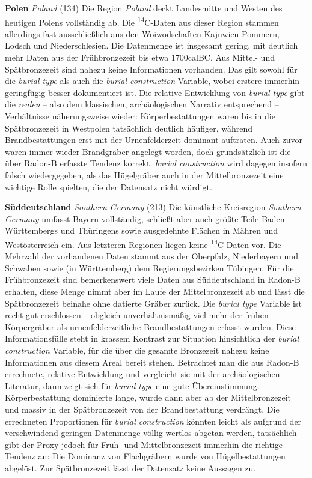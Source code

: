\documentclass[openany,twoside,twocolumn]{book}
\begin{document}
\textbf{Polen} \emph{Poland} (134) \newline  Die Region \emph{Poland}
deckt Landesmitte und Westen des heutigen Polens vollständig ab. Die
\textsuperscript{14}C-Daten aus dieser Region stammen allerdings fast
ausschließlich aus den Woiwodschaften Kajuwien-Pommern, Lodsch und
Niederschlesien. Die Datenmenge ist insgesamt gering, mit deutlich mehr
Daten aus der Frühbronzezeit bis etwa 1700calBC. Aus Mittel- und
Spätbronzezeit sind nahezu keine Informationen vorhanden. Das gilt
sowohl für die \emph{burial type} als auch die \emph{burial
construction} Variable, wobei erstere immerhin geringfügig besser
dokumentiert ist. Die relative Entwicklung von \emph{burial type} gibt
die \emph{realen} -- also dem klassischen, archäologischen Narrativ
entsprechend -- Verhältnisse näherungsweise wieder: Körperbestattungen
waren bis in die Spätbronzezeit in Westpolen tatsächlich deutlich
häufiger, während Brandbestattungen erst mit der Urnenfelderzeit
dominant auftraten. Auch zuvor waren immer wieder Brandgräber angelegt
worden, doch grundsätzlich ist die über Radon-B erfasste Tendenz
korrekt. \emph{burial construction} wird dagegen insofern falsch
wiedergegeben, als das Hügelgräber auch in der Mittelbronzezeit eine
wichtige Rolle spielten, die der Datensatz nicht würdigt.

\textbf{Süddeutschland} \emph{Southern Germany} (213) \newline  Die
künstliche Kreisregion \emph{Southern Germany} umfasst Bayern
vollständig, schließt aber auch größte Teile Baden-Württembergs und
Thüringens sowie ausgedehnte Flächen in Mähren und Westösterreich ein.
Aus letzteren Regionen liegen keine \textsuperscript{14}C-Daten vor. Die
Mehrzahl der vorhandenen Daten stammt aus der Oberpfalz, Niederbayern
und Schwaben sowie (in Württemberg) dem Regierungsbezirken Tübingen. Für
die Frühbronzezeit sind bemerkenswert viele Daten aus Süddeutschland in
Radon-B erhalten, diese Menge nimmt aber im Laufe der Mittelbronzezeit
ab und lässt die Spätbronzezeit beinahe ohne datierte Gräber zurück. Die
\emph{burial type} Variable ist recht gut erschlossen -- obgleich
unverhältnismäßig viel mehr der frühen Körpergräber als
urnenfelderzeitliche Brandbestattungen erfasst wurden. Diese
Informationsfülle steht in krassem Kontrast zur Situation hinsichtlich
der \emph{burial construction} Variable, für die über die gesamte
Bronzezeit nahezu keine Informationen aus diesem Areal bereit stehen.
Betrachtet man die aus Radon-B errechnete, relative Entwicklung und
vergleicht sie mit der archäologischen Literatur, dann zeigt sich für
\emph{burial type} eine gute Übereinstimmung. Körperbestattung
dominierte lange, wurde dann aber ab der Mittelbronzezeit und massiv in
der Spätbronzezeit von der Brandbestattung verdrängt. Die errechneten
Proportionen für \emph{burial construction} könnten leicht als aufgrund
der verschwindend geringen Datenmenge völlig wertlos abgetan werden,
tatsächlich gibt der Proxy jedoch für Früh- und Mittelbronzezeit
immerhin die richtige Tendenz an: Die Dominanz von Flachgräbern wurde
von Hügelbestattungen abgelöst. Zur Spätbronzezeit lässt der Datensatz
keine Aussagen zu.
\end{document}
